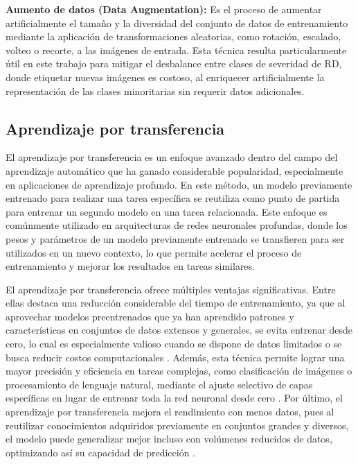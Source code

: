 \textbf{Aumento de datos (Data Augmentation):} Es el proceso de aumentar artificialmente
el tamaño y la diversidad del conjunto de datos de entrenamiento mediante la aplicación
de transformaciones aleatorias, como rotación, escalado, volteo o recorte, a las imágenes
de entrada. Esta técnica resulta particularmente útil en este trabajo para mitigar el
desbalance entre clases de severidad de RD, donde etiquetar nuevas imágenes es costoso,
al enriquecer artificialmente la representación de las clases minoritarias sin requerir
datos adicionales.

\subsection{Aprendizaje por transferencia}

El aprendizaje por transferencia es un enfoque avanzado dentro del campo del aprendizaje
automático que ha ganado considerable popularidad, especialmente en aplicaciones de
aprendizaje profundo. En este método, un modelo previamente entrenado para realizar una
tarea específica se reutiliza como punto de partida para entrenar un segundo modelo en
una tarea relacionada. Este enfoque es comúnmente utilizado en arquitecturas de redes
neuronales profundas, donde los pesos y parámetros de un modelo previamente entrenado se
transfieren para ser utilizados en un nuevo contexto, lo que permite acelerar el proceso
de entrenamiento y mejorar los resultados en tareas similares.

El aprendizaje por transferencia ofrece múltiples ventajas significativas. Entre ellas
destaca una reducción considerable del tiempo de entrenamiento, ya que al aprovechar
modelos preentrenados que ya han aprendido patrones y características en conjuntos de
datos extensos y generales, se evita entrenar desde cero, lo cual es especialmente
valioso cuando se dispone de datos limitados o se busca reducir costos computacionales
. Además, esta técnica permite lograr una mayor precisión y
eficiencia en tareas complejas, como clasificación de imágenes o procesamiento de
lenguaje natural, mediante el ajuste selectivo de capas específicas en lugar de entrenar
toda la red neuronal desde cero . Por último, el
aprendizaje por transferencia mejora el rendimiento con menos datos, pues al reutilizar
conocimientos adquiridos previamente en conjuntos grandes y diversos, el modelo puede
generalizar mejor incluso con volúmenes reducidos de datos, optimizando así su capacidad
de predicción .

